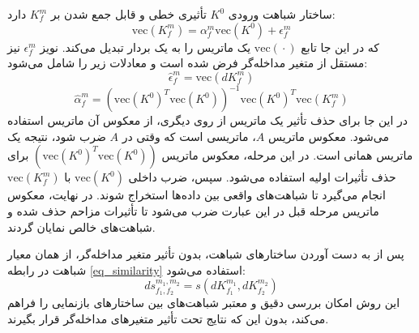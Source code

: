 ساختار شباهت ورودی \(K^0\) تأثیری خطی و قابل جمع شدن بر \(K^{m}_{f}\) دارد:
\begin{equation}
	\text{vec}(K^{m}_{f}) = \alpha^{m}_{f} \text{vec}(K^0) + \epsilon^{m}_{f}
\end{equation}
که در این جا تابع \(\text{vec}(‎\cdot)\) یک ماتریس را به یک بردار تبدیل می‌کند. نویز \(\epsilon^{m}_{f}\) نیز مستقل از متغیر مداخله‌گر فرض شده است و معادلات زیر را شامل می‌شود:
\begin{equation}
	\hat{\epsilon}^{m}_{f} = \text{vec}(dK^{m}_{f})
\end{equation}
\vspace{-34}
\begin{equation}
	\hat{\alpha}^{m}_{f} = (\text{vec}(K^0)^T \text{vec}(K^0))^{-1} \text{vec}(K^0)^T \text{vec}(K^{m}_{f})
\end{equation}
در این جا برای حذف تأثیر یک ماتریس از روی دیگری، از معکوس آن ماتریس استفاده می‌شود. معکوس ماتریس \(A\)، ماتریسی است که وقتی در \(A\) ضرب شود، نتیجه یک ماتریس همانی%
است.
در این مرحله، معکوس ماتریس \((\text{vec}(K^0)^T \text{vec}(K^0))\) برای حذف تأثیرات اولیه استفاده می‌شود. سپس، ضرب داخلی \(\text{vec}(K^0)\) با \(\text{vec}(K^{m}_{f})\) انجام می‌گیرد تا شباهت‌های واقعی بین داده‌ها استخراج شوند. در نهایت، معکوس ماتریس مرحله قبل در این عبارت ضرب می‌شود تا تأثیرات مزاحم حذف شده و شباهت‌های خالص نمایان گردند.


پس از به دست آوردن ساختارهای شباهت، بدون تأثیر متغیر مداخله‌گر، از همان معیار شباهت در رابطه
\eqref{eq_similarity}
استفاده می‌شود:
\begin{equation}
	ds^{m_1,m_2}_{f_1,f_2} = s(dK^{m_1}_{f_1}, dK^{m_2}_{f_2})
\end{equation}
این روش امکان بررسی دقیق و معتبر شباهت‌های بین ساختارهای بازنمایی را فراهم می‌کند، بدون این که نتایج تحت تأثیر متغیرهای مداخله‌گر قرار بگیرند.





